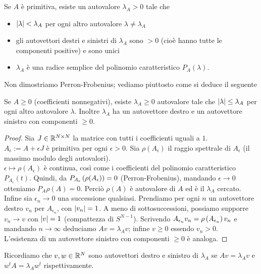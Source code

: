 \begin{teo}Se $A$ è primitiva, esiste un autovalore $\lambda_A>0$ tale che
\begin{itemize}
	\item $\left|\lambda\right|<\lambda_A$ per ogni altro autovalore $\lambda\neq\lambda_A$
	\item gli autovettori destri e sinistri di $\lambda_A$ sono $>0$ (cioè hanno tutte le componenti positive) e sono unici
	\item $\lambda_A$ è una radice semplice del polinomio caratteristico $P_A(\lambda)$.
\end{itemize}
\end{teo}

Non dimostriamo Perron-Frobenius; vediamo piuttosto come si deduce il seguente

\begin{cor}Se $A\ge 0$ (coefficienti nonnegativi), esiste $\lambda_A\ge 0$ autovalore tale che
$\left|\lambda\right|\le \lambda_A$ per ogni altro autovalore $\lambda$. Inoltre $\lambda_A$ ha un autovettore destro e un autovettore sinistro
con componenti $\ge 0$.
\end{cor}

\begin{proof}Sia $J\in\mathbb{R}^{N\times N}$ la matrice con tutti i coefficienti uguali a $1$. \\
$A_\epsilon:=A+\epsilon J$ è primitiva per ogni $\epsilon>0$. Sia $\rho(A_\epsilon)$ il raggio spettrale di $A_\epsilon$
(il massimo modulo degli autovalori). \\
$\epsilon\mapsto\rho(A_\epsilon)$ è continua, così come i coefficienti del polinomio caratteristico $P_{A_\epsilon}(t)$.
Quindi, da $P_{A_\epsilon}\left(\rho(A_\epsilon)\right)=0$ (Perron-Frobenius), mandando $\epsilon\to 0$ otteniamo $P_A{\rho(A)}=0$.
Perciò $\rho(A)$ è autovalore di $A$ ed è il $\lambda_A$ cercato. \\
Infine sia $\epsilon_n\to 0$ una successione qualsiasi. Prendiamo per ogni $n$ un autovettore destro $v_n$
per $A_{\epsilon_n}$, con $\left|v_n\right|=1$. A meno di sottosuccessioni, possiamo supporre $v_n\to v$ con $\left|v\right|=1$
(compattezza di $S^{N-1}$). Scrivendo $A_{\epsilon_n}v_n=\rho\left(A_{\epsilon_n}\right)v_n$ e mandando $n\to\infty$ deduciamo
$Av=\lambda_A v$; infine $v\ge 0$ essendo $v_n>0$. \\
L'esistenza di un autovettore sinistro con componenti $\ge 0$ è analoga.
\end{proof}

Ricordiamo che $v,w\in\mathbb{R}^N$ sono autovettori destro e sinistro di $\lambda_A$ se $Av=\lambda_A v$ e $w^t A=\lambda_A w^t$ rispettivamente.

